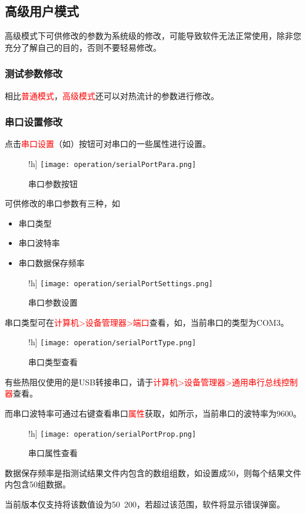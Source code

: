 \subsection{高级用户模式\label{subsec:advancedUser}}
\begin{note}
    高级模式下可供修改的参数为系统级的修改，可能导致软件无法正常使用，除非您充分了解自己的目的，否则不要轻易修改。
\end{note}
\subsubsection*{测试参数修改}
相比\textcolor{red}{普通模式}，\textcolor{red}{高级模式}还可以对热流计的参数进行修改。
\subsubsection*{串口设置修改}
点击\textcolor{red}{串口设置}（如）按钮可对串口的一些属性进行设置。
\begin{figure}!h]
    \centering
    \texttt{[image: operation/serialPortPara.png]}
    \caption{  串口参数按钮 \label{fig:btnSerialPortPara}}
\end{figure}
可供修改的串口参数有三种，如
\begin{itemize}
    \item 串口类型
    \item 串口波特率
    \item 串口数据保存频率
\end{itemize}
\begin{figure}!h]
    \centering
    \texttt{[image: operation/serialPortSettings.png]}
    \caption{  串口参数设置 \label{fig:serialPortSetting}}
\end{figure}
串口类型可在\textcolor{red}{计算机>设备管理器>端口}查看，如，当前串口的类型为COM3。
\begin{figure}!h]
    \centering
    \texttt{[image: operation/serialPortType.png]}
    \caption{  串口类型查看 \label{fig:serialPortType}}
\end{figure}
\begin{note}
    有些热阻仪使用的是USB转接串口，请于\textcolor{red}{计算机>设备管理器>通用串行总线控制器}查看。
\end{note}
而串口波特率可通过右键查看串口\textcolor{red}{属性}获取，如所示，当前串口的波特率为9600。
\begin{figure}!h]
    \centering
    \texttt{[image: operation/serialPortProp.png]}
    \caption{  串口属性查看 \label{fig:serialPortProp}}
\end{figure}
数据保存频率是指测试结果文件内包含的数组组数，如设置成50，则每个结果文件内包含50组数据。
\begin{note}
    当前版本仅支持将该数值设为50~200，若超过该范围，软件将显示错误弹窗。
\end{note}
